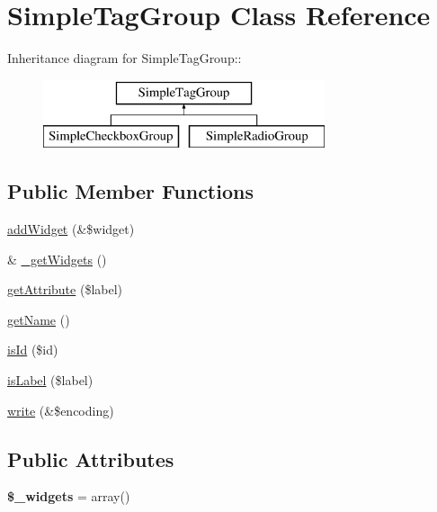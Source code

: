 \hypertarget{class_simple_tag_group}{
\section{SimpleTagGroup Class Reference}
\label{class_simple_tag_group}
}
Inheritance diagram for SimpleTagGroup::\begin{figure}[H]
\begin{center}
\leavevmode
\includegraphics[height=2cm]{class_simple_tag_group}
\end{center}
\end{figure}
\subsection*{Public Member Functions}
\begin{DoxyCompactItemize}
\item 
\hyperlink{class_simple_tag_group_a37fc41944b1eeb66b1e0255a7fe7bcd8}{addWidget} (\&\$widget)
\item 
\& \hyperlink{class_simple_tag_group_a72480ffb09fe8bad5dac4eeacb02591b}{\_\-getWidgets} ()
\item 
\hyperlink{class_simple_tag_group_a79b75c7101783bb1d620cbc86df36d1e}{getAttribute} (\$label)
\item 
\hyperlink{class_simple_tag_group_a69dae8d1ffa832734b4f533d5cd9d9c9}{getName} ()
\item 
\hyperlink{class_simple_tag_group_a8595e023fdedb78e15773de25333b963}{isId} (\$id)
\item 
\hyperlink{class_simple_tag_group_ab89e430363d358093bdfe2fb1e2290f9}{isLabel} (\$label)
\item 
\hyperlink{class_simple_tag_group_a2fc52631817cbe0d5bd5f7dda5cf87ec}{write} (\&\$encoding)
\end{DoxyCompactItemize}
\subsection*{Public Attributes}
\begin{DoxyCompactItemize}
\item 
\hypertarget{class_simple_tag_group_aed7e1b800e8acd43d4852fe1f61b63e8}{
{\bfseries \$\_\-widgets} = array()}
\label{class_simple_tag_group_aed7e1b800e8acd43d4852fe1f61b63e8}

\end{DoxyCompactItemize}


